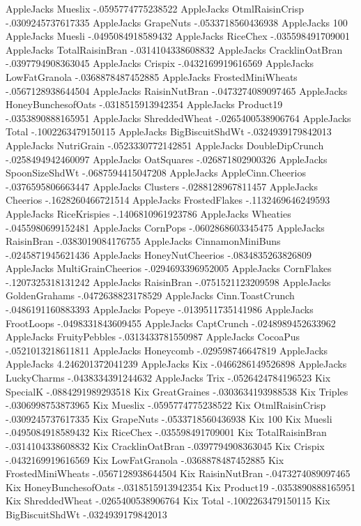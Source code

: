 AppleJacks	Mueslix	-.0595774775238522
AppleJacks	OtmlRaisinCrisp	-.0309245737617335
AppleJacks	GrapeNuts	-.0533718560436938
AppleJacks	100%
AppleJacks	Muesli	-.0495084918589432
AppleJacks	RiceChex	-.035598491709001
AppleJacks	TotalRaisinBran	-.0314104338608832
AppleJacks	CracklinOatBran	-.0397794908363045
AppleJacks	Crispix	-.0432169919616569
AppleJacks	LowFatGranola	-.0368878487452885
AppleJacks	FrostedMiniWheats	-.0567128938644504
AppleJacks	RaisinNutBran	-.0473274089097465
AppleJacks	HoneyBunchesofOats	-.0318515913942354
AppleJacks	Product19	-.0353890888165951
AppleJacks	ShreddedWheat	-.0265400538906764
AppleJacks	Total	-.1002263479150115
AppleJacks	BigBiscuitShdWt	-.0324939179842013
AppleJacks	NutriGrain	-.0523330772142851
AppleJacks	DoubleDipCrunch	-.0258494942460097
AppleJacks	OatSquares	-.026871802900326
AppleJacks	SpoonSizeShdWt	-.0687594415047208
AppleJacks	AppleCinn.Cheerios	-.0376595806663447
AppleJacks	Clusters	-.0288128967811457
AppleJacks	Cheerios	-.1628260466721514
AppleJacks	FrostedFlakes	-.1132469646249593
AppleJacks	RiceKrispies	-.1406810961923786
AppleJacks	Wheaties	-.0455980699152481
AppleJacks	CornPops	-.0602868603345475
AppleJacks	RaisinBran	-.0383019084176755
AppleJacks	CinnamonMiniBuns	-.0245871945621436
AppleJacks	HoneyNutCheerios	-.0834835263826809
AppleJacks	MultiGrainCheerios	-.0294693396952005
AppleJacks	CornFlakes	-.1207325318131242
AppleJacks	RaisinBran	-.0751521123209598
AppleJacks	GoldenGrahams	-.0472638823178529
AppleJacks	Cinn.ToastCrunch	-.0486191160883393
AppleJacks	Popeye	-.0139511735141986
AppleJacks	FrootLoops	-.0498331843609455
AppleJacks	CaptCrunch	-.0248989452633962
AppleJacks	FruityPebbles	-.0313433781550987
AppleJacks	CocoaPus	-.0521013218611811
AppleJacks	Honeycomb	-.029598746647819
AppleJacks	AppleJacks	4.246201372041239
AppleJacks	Kix	-.0466286149526898
AppleJacks	LuckyCharms	-.0438334391244632
AppleJacks	Trix	-.0526424784196523
Kix	SpecialK	-.0884291989293518
Kix	GreatGraines	-.0303634193988538
Kix	Triples	-.0306998753873965
Kix	Mueslix	-.0595774775238522
Kix	OtmlRaisinCrisp	-.0309245737617335
Kix	GrapeNuts	-.0533718560436938
Kix	100%
Kix	Muesli	-.0495084918589432
Kix	RiceChex	-.035598491709001
Kix	TotalRaisinBran	-.0314104338608832
Kix	CracklinOatBran	-.0397794908363045
Kix	Crispix	-.0432169919616569
Kix	LowFatGranola	-.0368878487452885
Kix	FrostedMiniWheats	-.0567128938644504
Kix	RaisinNutBran	-.0473274089097465
Kix	HoneyBunchesofOats	-.0318515913942354
Kix	Product19	-.0353890888165951
Kix	ShreddedWheat	-.0265400538906764
Kix	Total	-.1002263479150115
Kix	BigBiscuitShdWt	-.0324939179842013
